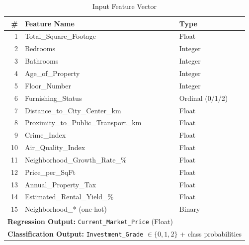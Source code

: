 \documentclass[12pt,a4paper]{article}
\begin{document}
\begin{table}[H]
\centering
\caption{Input Feature Vector}
\begin{tabular}{@{} r l l @{}}
\toprule
\textbf{\#} & \textbf{Feature Name} & \textbf{Type} \\
\midrule
1  & Total\_Square\_Footage              & Float   \\
2  & Bedrooms                            & Integer \\
3  & Bathrooms                           & Integer \\
4  & Age\_of\_Property                   & Integer \\
5  & Floor\_Number                       & Integer \\
6  & Furnishing\_Status                  & Ordinal (0/1/2) \\
7  & Distance\_to\_City\_Center\_km      & Float   \\
8  & Proximity\_to\_Public\_Transport\_km & Float  \\
9  & Crime\_Index                        & Float   \\
10 & Air\_Quality\_Index                 & Float   \\
11 & Neighborhood\_Growth\_Rate\_\%      & Float   \\
12 & Price\_per\_SqFt                    & Float   \\
13 & Annual\_Property\_Tax               & Float   \\
14 & Estimated\_Rental\_Yield\_\%        & Float   \\
15 & Neighborhood\_* (one-hot)           & Binary  \\
\midrule
\multicolumn{3}{l}{\textbf{Regression Output:} \texttt{Current\_Market\_Price} (Float)} \\
\multicolumn{3}{l}{\textbf{Classification Output:} \texttt{Investment\_Grade} $\in \{0, 1, 2\}$ + class probabilities} \\
\bottomrule
\end{tabular}
\end{table}
\end{document}
